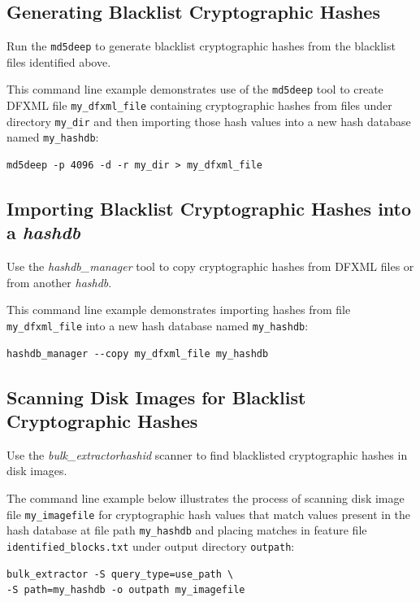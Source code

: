 \documentclass[11pt,twoside]{article}
\newcommand \bulk {\textit{bulk\_extractor}\xspace}
\newcommand \hdb {\textit{hashdb}\xspace}
\newcommand \hdbm {\textit{hashdb\_manager}\xspace}
\newcommand \hid {\textit{hashid}\xspace}
\begin{document}
\subsection{Generating Blacklist Cryptographic Hashes}
Run the \texttt{md5deep} to generate blacklist cryptographic hashes
from the blacklist files identified above.

This command line example demonstrates use of the \texttt{md5deep} tool
to create DFXML file \texttt{my\_dfxml\_file}
containing cryptographic hashes from files under directory \texttt{my\_dir}
and then importing those hash values into a new hash database
named \texttt{my\_hashdb}:

\begin{small}
\begin{verbatim}
md5deep -p 4096 -d -r my_dir > my_dfxml_file
\end{verbatim}
\end{small}

\subsection{Importing Blacklist Cryptographic Hashes into a \hdb}
Use the \hdbm tool to copy cryptographic hashes from DFXML files
or from another \hdb.

This command line example demonstrates importing
hashes from file \texttt{my\_dfxml\_file}
into a new hash database named \texttt{my\_hashdb}:

\begin{small}
\begin{verbatim}
hashdb_manager --copy my_dfxml_file my_hashdb
\end{verbatim}
\end{small}

\subsection{Scanning Disk Images for Blacklist Cryptographic Hashes}
Use the \bulk \hid scanner to find blacklisted cryptographic hashes in disk images.

The command line example below illustrates the process of scanning
disk image file \texttt{my\_imagefile}
for cryptographic hash values that match values present
in the hash database at file path \texttt{my\_hashdb} and placing
matches in feature file \texttt{identified\_blocks.txt}
under output directory \texttt{outpath}:

\begin{small}
\begin{verbatim}
bulk_extractor -S query_type=use_path \
-S path=my_hashdb -o outpath my_imagefile
\end{verbatim}
\end{small}
\end{document}
